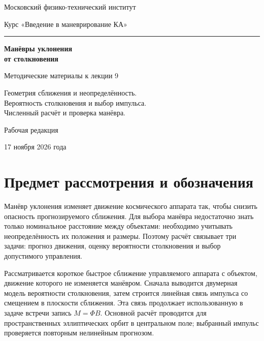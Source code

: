 \documentclass[a4paper,11pt]{article}
\numberwithin{equation}{section}
\begin{document}
\begin{titlepage}
\centering
{\large Московский физико-технический институт\par}
\vspace{8mm}
{\large Курс «Введение в маневрирование КА»\par}
\vspace{32mm}
{\color{accent}\rule{28mm}{.8pt}\par}
\vspace{9mm}
{\LARGE\bfseries Манёвры уклонения\\[3mm]
от столкновения\par}
\vspace{11mm}
{\large Методические материалы к лекции 9\par}
\vspace{8mm}
{Геометрия сближения и неопределённость.\\
Вероятность столкновения и выбор импульса.\\
Численный расчёт и проверка манёвра.\par}
\vfill
{Рабочая редакция\par}
\vspace{3mm}
{17 ноября 2026 года\par}
\end{titlepage}
\setcounter{page}{2}
\begingroup\small
\setlength{\parskip}{0pt}
\tableofcontents
\endgroup
\clearpage

\section*{Предмет рассмотрения и обозначения}

Манёвр уклонения изменяет движение космического аппарата так, чтобы снизить
опасность прогнозируемого сближения. Для выбора манёвра недостаточно
знать только номинальное расстояние между объектами: необходимо
учитывать неопределённость их положения и размеры. Поэтому расчёт
связывает три задачи: прогноз движения, оценку вероятности столкновения
и выбор допустимого управления.

Рассматривается короткое быстрое сближение управляемого аппарата
с объектом, движение которого не изменяется манёвром. Сначала
выводится двумерная модель вероятности столкновения, затем строится
линейная связь импульса со смещением в плоскости сближения.
Эта связь продолжает использованную в задаче встречи запись
$M=\Phi B$. Основной расчёт проводится для пространственных
эллиптических орбит в центральном поле; выбранный импульс проверяется
повторным нелинейным прогнозом.
\end{document}
